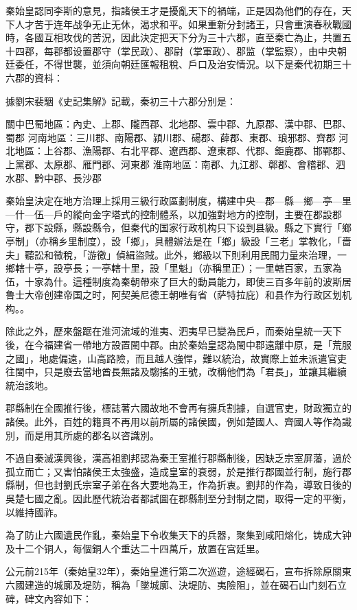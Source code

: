 秦始皇認同李斯的意見，指諸侯王才是擾亂天下的禍端，正是因為他們的存在，天下人才苦于连年战争无止无休，渴求和平。如果重新分封諸王，只會重演春秋戰國時，各國互相攻伐的苦況，因此決定把天下分为三十六郡，直至秦亡為止，共置五十四郡，每郡都设置郡守（掌民政）、郡尉（掌軍政）、郡监（掌監察），由中央朝廷委任，不得世襲，並須向朝廷匯報租稅、戶口及治安情況。以下是秦代初期三十六郡的資枓：

據劉宋裴駰《史記集解》記載，秦初三十六郡分別是：

關中巴蜀地區：內史、上郡、隴西郡、北地郡、雲中郡、九原郡、漢中郡、巴郡、蜀郡
河南地區：三川郡、南陽郡、潁川郡、碭郡、薛郡、東郡、琅邪郡、齊郡
河北地區：上谷郡、漁陽郡、右北平郡、遼西郡、遼東郡、代郡、鉅鹿郡、邯鄲郡、上黨郡、太原郡、雁門郡、河東郡
淮南地區：南郡、九江郡、鄣郡、會稽郡、泗水郡、黔中郡、長沙郡

秦始皇決定在地方治理上採用三級行政區劃制度，構建中央—郡—縣—鄉—亭—里—什—伍—戶的縱向金字塔式的控制體系，以加強對地方的控制，主要在郡設郡守，郡下設縣，縣設縣令，但秦代的国家行政机构只下设到县級。縣之下實行「鄉亭制」（亦稱乡里制度），設「鄉」，具體辦法是在「鄉」級設「三老」掌教化，「嗇夫」聽訟和徵稅，「游徼」偵緝盜賊。此外，鄉級以下則利用民間力量來治理，一鄉轄十亭，設亭長；一亭轄十里，設「里魁」（亦稱里正）；一里轄百家，五家為伍，十家為什。這種制度為秦朝帶來了巨大的動員能力，即使三百多年前的波斯居鲁士大帝创建帝国之时，阿契美尼德王朝唯有省（萨特拉庇）和县作为行政区划机构。。

除此之外，歷來盤踞在淮河流域的淮夷、泗夷早已變為民戶，而秦始皇統一天下後，在今福建省一帶地方設置閩中郡。由於秦始皇認為閩中郡遠離中原，是「荒服之國」，地處偏遠，山高路險，而且越人強悍，難以統治，故實際上並未派遣官吏往閩中，只是廢去當地酋長無諸及騶搖的王號，改稱他們為「君長」，並讓其繼續統治該地。

郡縣制在全國推行後，標誌著六國故地不會再有擁兵割據，自選官吏，財政獨立的諸侯。此外，百姓的籍貫不再用以前所屬的諸侯國，例如楚國人、齊國人等作為識別，而是用其所處的郡名以咨識別。

不過自秦滅漢興後，漢高祖劉邦認為秦王室推行郡縣制後，因缺乏宗室屏藩，過於孤立而亡；又害怕諸侯王太強盛，造成皇室的衰弱，於是推行郡國並行制，施行郡縣制，但也封劉氏宗室子弟在各大要地為王，作為折衷。劉邦的作為，導致日後的吳楚七國之亂。因此歷代統治者都試圖在郡縣制至分封制之間，取得一定的平衡，以維持國祚。

為了防止六國遺民作亂，秦始皇下令收集天下的兵器，聚集到咸阳熔化，铸成大钟及十二个铜人，每個銅人个重达二十四萬斤，放置在宫廷里。

公元前215年（秦始皇32年），秦始皇進行第二次巡遊，途經碣石，宣布拆除原關東六國建造的城廓及堤防，稱為「墜城廓、決堤防、夷險阻」，並在碣石山门刻石立碑，碑文內容如下：

